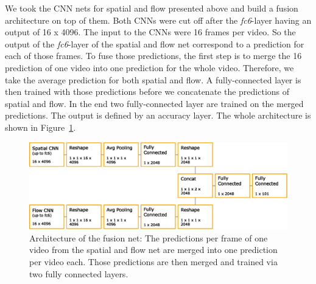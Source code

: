 We took the CNN nets for spatial and flow presented above and build a fusion architecture on top of them.
Both CNNs were cut off after the \textit{fc6}-layer having an output of 16 x 4096.
The input to the CNNs were 16 frames per video.
So the output of the \textit{fc6}-layer of the spatial and flow net correspond to a prediction for each of those frames.
To fuse those predictions, the first step is to merge the 16 prediction of one video into one prediction for the whole video.
Therefore, we take the average prediction for both spatial and flow.
A fully-connected layer is then trained with those predictions before we concatenate the predictions of spatial and flow.
In the end two fully-connected layer are trained on the merged predictions.
The output is defined by an accuracy layer.
The whole architecture is shown in Figure~\ref{fig:fusion_architecture}.
\begin{figure}[!htb]
	\centering
	\includegraphics[scale=.7]{images/fusion_architecture.eps}
	\caption{Architecture of the fusion net: The predictions per frame of one video from the spatial and flow net are merged into one prediction per video each. Those predictions are then merged and trained via two fully connected layers.}
	\label{fig:fusion_architecture}
\end{figure}






